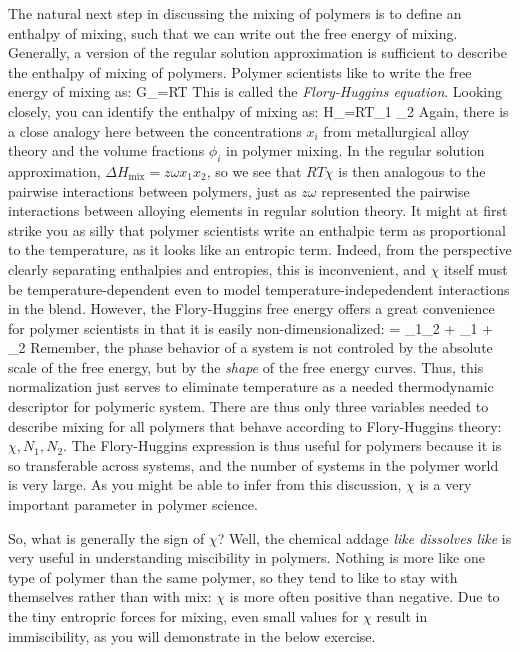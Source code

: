\documentclass[12pt]{article}
\begin{document}
The natural next step in discussing the mixing of polymers is to define an enthalpy of mixing, such that we can write out the free energy of mixing. Generally, a version of the regular solution approximation is sufficient to describe the enthalpy of mixing of polymers. Polymer scientists like to write the free energy of mixing as:
\eqs
\Delta G_=RT 
\eqe
This is called the \emph{Flory-Huggins equation}. Looking closely, you can identify the enthalpy of mixing as:
\eqs
\Delta H_=RT\chi \phi_1 \phi_2
\eqe
Again, there is a close analogy here between the concentrations $x_i$ from metallurgical alloy theory and the volume fractions $\phi_i$ in polymer mixing. In the regular solution approximation, $\Delta H_\text{mix}=z\omega x_1 x_2$, so we see that $RT\chi$ is then analogous to the pairwise interactions between polymers, just as $z\omega$ represented the pairwise interactions between alloying elements in regular solution theory. It might at first strike you as silly that polymer scientists write an enthalpic term as proportional to the temperature, as it looks like an entropic term. Indeed, from the perspective clearly separating enthalpies and entropies, this is inconvenient, and $\chi$ itself must be temperature-dependent even to model temperature-indepedendent interactions in the blend. However, the Flory-Huggins free energy offers a great convenience for polymer scientists in that it is easily non-dimensionalized:
\eqs
{}= \chi \phi_1\phi_2 +  \ln \phi_1 +   \ln \phi_2 
\eqe
Remember, the phase behavior of a system is not controled by the absolute scale of the free energy, but by the \emph{shape} of the free energy curves. Thus, this normalization just serves to eliminate temperature as a needed thermodynamic descriptor for polymeric system. There are thus only three variables needed to describe mixing for all polymers that behave according to Flory-Huggins theory: $\chi, N_1,N_2$. The Flory-Huggins expression is thus useful for polymers because it is so transferable across systems, and the number of systems in the polymer world is very large. As you might be able to infer from this discussion, $\chi$ is a very important parameter in polymer science.

So, what is generally the sign of $\chi$? Well, the chemical addage \emph{like dissolves like} is very useful in understanding miscibility in polymers. Nothing is more like one type of polymer than the same polymer, so they tend to like to stay with themselves rather than with mix: $\chi$ is more often positive than negative. Due to the tiny entropric forces for mixing, even small values for $\chi$ result in immiscibility, as you will demonstrate in the below exercise.
\end{document}
